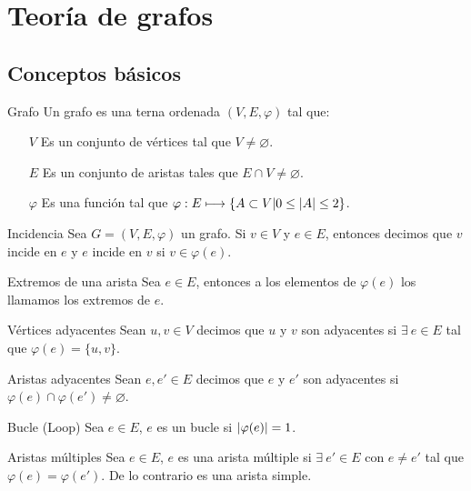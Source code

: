 \section{Teoría de grafos}
    \subsection{Conceptos básicos}
        \begin{definition}{Grafo}
            Un grafo es una terna ordenada $(V,E,\varphi)$ tal que:
            \begin{itemize}
                \item[$V$] Es un conjunto de vértices tal que $V\neq\varnothing$.
                \item[$E$] Es un conjunto de aristas tales que $E\cap V\neq\varnothing$.
                \item[$\varphi$] Es una función tal que $\varphi:E\longmapsto\{A\subset V|0\le\abs{A}\le2\}$.
            \end{itemize}
        \end{definition}
        \begin{definition}{Incidencia}
            Sea $G=(V,E,\varphi)$ un grafo. Si $v\in V$ y $e\in E$, entonces decimos que $v$ incide en $e$ y $e$ incide en $v$ si $v\in\varphi(e)$.
        \end{definition}
        \begin{definition}{Extremos de una arista}
            Sea $e\in E$, entonces a los elementos de $\varphi(e)$ los llamamos los extremos de $e$.
        \end{definition}
        \begin{definition}{Vértices adyacentes}
            Sean $u,v\in V$ decimos que $u$ y $v$ son adyacentes si $\exists\: e\in E$ tal que $\varphi(e)=\{u,v\}$.
        \end{definition}
        \begin{definition}{Aristas adyacentes}
            Sean $e,e'\in E$ decimos que $e$ y $e'$ son adyacentes si $\varphi(e)\cap\varphi(e')\neq\varnothing$.
        \end{definition}
        \begin{definition}{Bucle (Loop)}
            Sea $e\in E$, $e$ es un bucle si $\abs{\varphi(e)}=1$.
        \end{definition}
        \begin{definition}{Aristas múltiples}
            Sea $e\in E$, $e$ es una arista múltiple si $\exists\:e'\in E$ con $e\neq e'$ tal que $\varphi(e)=\varphi(e')$. De lo contrario es una arista simple.
        \end{definition}
